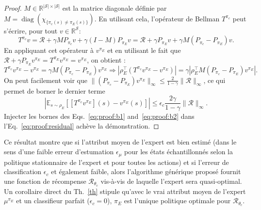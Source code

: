 \documentclass[english,utf8]{./hermes-journal}
\newcommand{\diag}{\operatorname*{diag}}
\newcommand{\R}{\mathcal{R}}
\newcommand{\s}{\mathcal{S}}
\newcommand{\E}{\mathbb{E}}
\begin{document}
\begin{proof}
   $M\in\mathbb{R}^{|\s|\times |\s|}$ est la matrice diagonale définie par $M = \diag (\chi_{\{\pi_c(s)\neq\pi_E(s)\}})$. En utilisant cela, l'opérateur de Bellman $T^{\pi_c}$ peut s'écrire, pour tout $v\in\mathbb{R}^\s$:
  \begin{equation}
    T^{\pi_c}v = \R + \gamma M P_{\pi_c} v + \gamma (I-M)P_{\pi_E} v
    = \R + \gamma P_{\pi_E} v + \gamma M (P_{\pi_c}-P_{\pi_E})v.
  \end{equation}
  En appliquant cet opérateur à  $v^{\pi_E}$ et en utilisant le fait que $\R +
  \gamma P_{\pi_E} v^{\pi_E} = T^{\pi_E} v^{\pi_E} = v^{\pi_E}$, on obtient :
  \begin{equation}
    T^{\pi_c}v^{\pi_E} - v^{\pi_E} = \gamma M
    (P_{\pi_c}-P_{\pi_E})v^{\pi_E}
    \Rightarrow |\rho_E^\top (T^{\pi_c}v^{\pi_E} - v^{\pi_E})| = \gamma
    |\rho_E^\top M (P_{\pi_c}-P_{\pi_E})v^{\pi_E}|.
  \end{equation}
  On peut facilement voir que $\|(P_{\pi_c}-P_{\pi_E})v^{\pi_E}\|_\infty
  \leq \frac{2}{1-\gamma}\|\R\|_\infty$, ce qui permet de borner le dernier terme
  \begin{equation}
    |\E_{s\sim\rho_E}[[T^{\pi_c}v^{\pi_E}](s) - v^{\pi_E}(s)]| \leq
    \epsilon_c \frac{2\gamma}{1-\gamma} \|\R\|_\infty.
    \label{eq:proof:b2}
  \end{equation}
  Injecter les bornes des Eqs.~\eqref{eq:proof:b1}
  and~\eqref{eq:proof:b2} dans l'Eq.~\eqref{eq:proof:residual} achève la démonstration.%
\end{proof}

Ce résultat montre que si l'attribut moyen de l'expert est bien estimé (dans le sens d'une faible erreur d'estumation $\epsilon_\mu$ pour les états échantillonnés selon la politique stationnaire de l'expert et pour toutes les actions) et si l'erreur de classification $\epsilon_c$ et également faible, alors l'algorithme générique proposé fournit une fonction de récompense 
$\R_{\theta_c}$ vis-à-vis de laquelle l'expert sera quasi-optimal. Un corollaire direct du Th.~\ref{th} stipule qu'avec le vrai attribut moyen de l'expert $\mu^{\pi_E}$ et un classifieur parfait 
($\epsilon_c=0$), $\pi_E$ est l'unique politique optimale pour 
$\R_{\theta_c}$.
\end{document}

